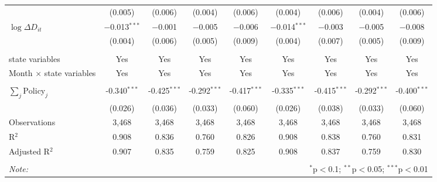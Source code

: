 \begin{tabular}{@{\extracolsep{1pt}}lcccccccc}
  & (0.005) & (0.006) & (0.004) & (0.006) & (0.004) & (0.006) & (0.004) & (0.006) \\ 
  $\log \Delta D_{it}$ & $-$0.013$^{***}$ & $-$0.001 & $-$0.005 & $-$0.006 & $-$0.014$^{***}$ & $-$0.003 & $-$0.005 & $-$0.008 \\ 
  & (0.004) & (0.006) & (0.005) & (0.009) & (0.004) & (0.007) & (0.005) & (0.009) \\ 
 \hline \\[-1.8ex] 
state variables & Yes & Yes & Yes & Yes & Yes & Yes & Yes & Yes \\ 
Month $\times$ state variables & Yes & Yes & Yes & Yes & Yes & Yes & Yes & Yes \\ 
\hline \\[-1.8ex] 
$\sum_j \mathrm{Policy}_j$ & -0.340$^{***}$ & -0.425$^{***}$ & -0.292$^{***}$ & -0.417$^{***}$ & -0.335$^{***}$ & -0.415$^{***}$ & -0.292$^{***}$ & -0.400$^{***}$ \\ 
 & (0.026) & (0.036) & (0.033) & (0.060) & (0.026) & (0.038) & (0.033) & (0.060) \\ 
Observations & 3,468 & 3,468 & 3,468 & 3,468 & 3,468 & 3,468 & 3,468 & 3,468 \\ 
R$^{2}$ & 0.908 & 0.836 & 0.760 & 0.826 & 0.908 & 0.838 & 0.760 & 0.831 \\ 
Adjusted R$^{2}$ & 0.907 & 0.835 & 0.759 & 0.825 & 0.908 & 0.837 & 0.759 & 0.830 \\ 
\hline 
\hline \\[-1.8ex] 
\textit{Note:}  & \multicolumn{8}{r}{$^{*}$p$<$0.1; $^{**}$p$<$0.05; $^{***}$p$<$0.01} \\ 
\end{tabular} 